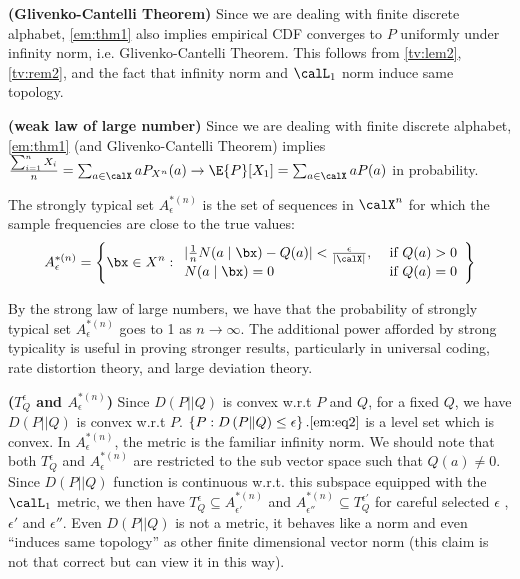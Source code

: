 \documentclass{article}
\newcommand{\bfs}[1]{\textbf{({#1})}}
\begin{document}
\begin{rema}{\bfs{Glivenko-Cantelli Theorem}}
Since we are dealing with finite discrete alphabet, \cref{em:thm1} also implies {empirical CDF converges to $P$ uniformly under infinity norm},  i.e. Glivenko-Cantelli Theorem. This follows from \cref{tv:lem2}, \cref{tv:rem2}, and the fact  that infinity norm and $\calL_1$ norm induce same topology. 
\end{rema}

\begin{rema}{\bfs{weak law of large number}}
Since we are dealing with finite discrete alphabet, \cref{em:thm1} (and Glivenko-Cantelli Theorem) implies $\frac{\sum_{i=1}^n X_i}{n} = \sum_{a\in\calX} aP_{X^n}(a)\to  \E{P}[X_1] = \sum_{a\in\calX} aP(a)$ in probability.
\end{rema}

\begin{defa}{}
The strongly typical set $A_{\epsilon}^{*(n)}$ is the set of sequences in $\calX ^{n}$ for which the sample frequencies are close to the true values:
\begin{align*}
A_{\epsilon}^{*(n)}=\Bigg\{%
 \bx \in X ^{n}:  \begin{array}{ll}
|\frac{1}{n} N(a \mid \bx )-Q(a) |<\frac{\epsilon}{| \calX |}, &\text { if } Q(a)>0 \\
N(a \mid \bx )=0 &\text { if } Q(a)=0
\end{array}\Bigg\}
\end{align*}
\end{defa}

By the strong law of large numbers, we have that the probability of strongly typical set $A_{\epsilon}^{*(n)}$ goes to 1 as $n \rightarrow \infty$. The additional power afforded by strong typicality is useful in proving stronger results, particularly in universal coding, rate distortion theory, and large deviation theory. 

\begin{rema}{\bfs{$T_{Q}^{\epsilon}$ and  $A_{\epsilon}^{*(n)}$}}
Since $D(P||Q)$ is convex w.r.t $P$ and $Q$, for a fixed $Q$, we have $D(P||Q)$ is convex w.r.t $P$. $\left\{P: D\left(P\| Q\right) \leq \epsilon\right\}. \cref{em:eq2}$ is a level set which is convex. In $A_{\epsilon}^{*(n)}$, the metric is the familiar infinity norm. We should note that both $T_{Q}^{\epsilon}$ and $A_{\epsilon}^{*(n)}$ are restricted to the sub vector space such that $Q(a)\ne 0$. Since $D(P||Q)$ function is continuous w.r.t. this subspace equipped with the $\calL_1$ metric, we then have $T_{Q}^{\epsilon}\subseteq A_{\epsilon'}^{*(n)}$ and  $A_{\epsilon''}^{*(n)}\subseteq T_{Q}^{\epsilon'}$ for careful selected $\epsilon$ , $\epsilon'$ and $\epsilon''$. Even $D(P||Q)$ is not a metric, it behaves like a norm and even ``induces same topology'' as other finite dimensional vector norm (this claim is not that correct but can view it in this way).
\end{rema}
\end{document}
